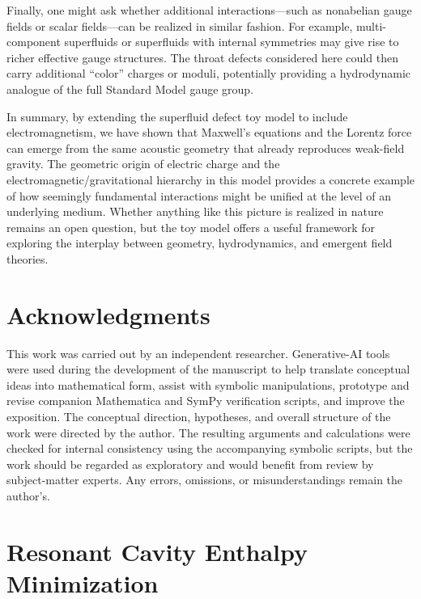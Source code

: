 \documentclass[11pt]{article}
\begin{document}
Finally, one might ask whether additional interactions---such as nonabelian gauge fields or scalar fields---can be realized in similar fashion.  For example, multi-component superfluids or superfluids with internal symmetries may give rise to richer effective gauge structures.  The throat defects considered here could then carry additional ``color'' charges or moduli, potentially providing a hydrodynamic analogue of the full Standard Model gauge group.

In summary, by extending the superfluid defect toy model to include electromagnetism, we have shown that Maxwell's equations and the Lorentz force can emerge from the same acoustic geometry that already reproduces weak-field gravity.  The geometric origin of electric charge and the electromagnetic/gravitational hierarchy in this model provides a concrete example of how seemingly fundamental interactions might be unified at the level of an underlying medium.  Whether anything like this picture is realized in nature remains an open question, but the toy model offers a useful framework for exploring the interplay between geometry, hydrodynamics, and emergent field theories.

\section*{Acknowledgments}

This work was carried out by an independent researcher. Generative-AI tools were used during the development of the manuscript to help translate conceptual ideas into mathematical form, assist with symbolic manipulations, prototype and revise companion Mathematica and SymPy verification scripts, and improve the exposition. The conceptual direction, hypotheses, and overall structure of the work were directed by the author. The resulting arguments and calculations were checked for internal consistency using the accompanying symbolic scripts, but the work should be regarded as exploratory and would benefit from review by subject-matter experts. Any errors, omissions, or misunderstandings remain the author's.


\appendix

\section{Resonant Cavity Enthalpy Minimization}
\label{app:cavity}
\end{document}
